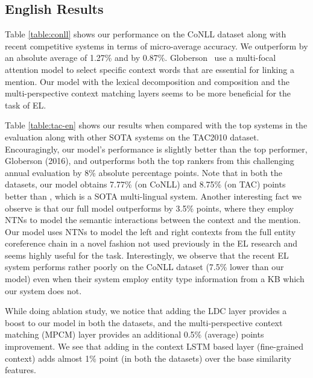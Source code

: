 \documentclass[letterpaper]{article} \usepackage{aaai18}  \usepackage{times}  \usepackage{helvet}  \usepackage{courier}  \usepackage{url}  \usepackage{graphicx}  \frenchspacing  \setlength{\pdfpagewidth}{8.5in}  \setlength{\pdfpageheight}{11in}  \usepackage{latexsym}
\begin{document}
\subsection{English Results}
Table \ref{table:conll} shows our performance on the CoNLL dataset along with recent competitive systems in terms of micro-average accuracy. We outperform \cite{globerson2016collective} by an absolute average of 1.27\% and \cite{yamada2016joint} by 0.87\%. Globerson \etal\ use a multi-focal attention model to select specific context words that are essential for linking a mention. Our model  with the lexical decomposition and composition and the multi-perspective context matching layers seems to be more beneficial for the task of EL.




Table \ref{table:tac-en} shows our results when compared with the top systems in the evaluation along with other SOTA systems on the TAC2010 dataset. Encouragingly, our model’s performance is slightly better than the top performer, Globerson (2016), and outperforms both the top rankers from this challenging annual evaluation by 8\% absolute percentage points. Note that in both the datasets, our model obtains 7.77\% (on CoNLL) and 8.75\% (on TAC) points better than \cite{sil2016one}, which is a SOTA multi-lingual system. Another interesting fact we observe is that our full model outperforms  \cite{sun2015modeling} by 3.5\% points, where they employ NTNs to model the semantic interactions between the context and the mention. Our model uses NTNs to model the left and right contexts from the full entity coreference chain in a novel fashion not used previously in the EL research and seems highly useful for the task.
Interestingly, we observe that the recent \cite{gupta2017entity} EL system performs rather poorly on the CoNLL dataset (7.5\% lower than our model) even when their system employ entity type information from a KB which our system does not.

While doing ablation study, we notice that adding the LDC layer provides a boost to our model in both the datasets, and the multi-perspective context matching (MPCM) layer provides an additional  0.5\% (average) points improvement. We see that adding in the context LSTM based layer (fine-grained context) adds almost 1\% point (in both the datasets) over the base similarity features.
\end{document}

